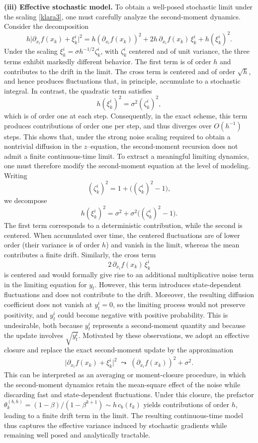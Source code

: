 \documentclass[11pt, a4paper,leqno]{amsart}
\theoremstyle{definition}
\numberwithin{equation}{section}
\begin{document}
\medskip
\noindent
\textbf{(iii) Effective stochastic model.}
To obtain a well-posed stochastic limit under the scaling \eqref{klara3}, one must carefully analyze the second-moment dynamics. Consider the decomposition
\[
h\bigl|\partial_{x_i}f(x_k)+\xi_k^i\bigr|^2
=
h(\partial_{x_i}f(x_k))^2
+
2h\,\partial_{x_i}f(x_k)\,\xi_k^i
+
h(\xi_k^i)^2.
\]
Under the scaling $\xi_k^i=\sigma h^{-1/2}\zeta_k^i$, with $\zeta_k^i$ centered and of unit variance, the three terms exhibit markedly different behavior. The first term is of order $h$ and contributes to the drift in the limit. The cross term is centered and of order $\sqrt{h}$, and hence produces fluctuations that, in principle, accumulate to a stochastic integral. In contrast, the quadratic term satisfies
\[
h(\xi_k^i)^2 = \sigma^2(\zeta_k^i)^2,
\]
which is of order one at each step. Consequently, in the exact scheme, this term produces contributions of order one per step, and thus diverges over $O(h^{-1})$ steps. This shows that, under the strong noise scaling required to obtain a nontrivial diffusion in the $z$–equation, the second-moment recursion does not admit a finite continuous-time limit. To extract a meaningful limiting dynamics, one must therefore modify the second-moment equation at the level of modeling. Writing
\[
(\zeta_k^i)^2 = 1 + \bigl((\zeta_k^i)^2 - 1\bigr),
\]
we decompose
\[
h(\xi_k^i)^2
=
\sigma^2
+
\sigma^2\bigl((\zeta_k^i)^2 - 1\bigr).
\]
The first term corresponds to a deterministic contribution, while the second is centered. When accumulated over time, the centered fluctuations are of lower order (their variance is of order $h$) and vanish in the limit, whereas the mean contributes a finite drift. Similarly, the cross term
\[
2\,\partial_{x_i}f(x_k)\,\xi_k^i
\]
is centered and would formally give rise to an additional multiplicative noise term in the limiting equation for $y_t$. However, this term introduces state-dependent fluctuations and does not contribute to the drift. Moreover, the resulting diffusion coefficient does not vanish at $y_t^i=0$, so the limiting process would not preserve positivity, and $y_t^i$ could become negative with positive probability. This is undesirable, both because $y_t^i$ represents a second-moment quantity and because the update involves $\sqrt{y_t^i}$. Motivated by these observations, we adopt an effective closure and replace the exact second-moment update by the approximation
\begin{align*}
\bigl|\partial_{x_i}f(x_k)+\xi_k^i\bigr|^2
\;\leadsto\;
(\partial_{x_i}f(x_k))^2 + \sigma^2.
\end{align*}
This can be interpreted as an averaging or moment-closure procedure, in which the second-moment dynamics retain the mean-square effect of the noise while discarding fast and state-dependent fluctuations. Under this closure, the prefactor $\theta_k^{(b,h)}={(1-\beta)}/{(1-\beta^{k+1})}\sim h\,c_b(t_k)$ yields contributions of order $h$, leading to a finite drift term in the limit. The resulting continuous-time model thus captures the effective variance induced by stochastic gradients while remaining well posed and analytically tractable.
\end{document}
